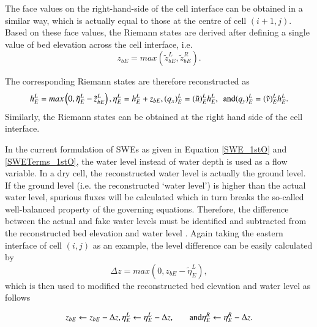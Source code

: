 The face values on the right-hand-side of the cell interface can be obtained in a similar way, which is actually equal to those at the centre of cell $(i + 1, j)$. Based on these face values, the Riemann states are derived after defining a single value of bed elevation across the cell interface, i.e.
\begin{equation}
	\label{SWE_1stO_BedElev}
	z_{bE} = max \left ( \tilde{z}_{bE}^{L}, \tilde{z}_{bE}^{R} \right )
	.
\end{equation}

The corresponding Riemann states are therefore reconstructed as
\begin{equation}
	\label{SWE_1stO_Reconstruction}
	h_{E}^{L} = max \left ( 0, \tilde{\eta}_{E}^{L} - \tilde{z}_{bE}^{L} \right ), \\
	\eta_{E}^{L} = h_{E}^{L} + z_{bE}, \\
	(q_{x})_{E}^{L} = (\tilde{u})_{E}^{L} h_{E}^{L},
	\hspace{1ex} \textrm{and} \hspace{1ex}	\\
	(q_{y})_{E}^{L} = (\tilde{v})_{E}^{L} h_{E}^{L}
	.
\end{equation}
Similarly, the Riemann states can be obtained at the right hand side of the cell interface.

In the current formulation of SWEs as given in Equation \ref{SWE_1stO} and \ref{SWETerms_1stO}, the water level instead of water depth is used as a flow variable. In a dry cell, the reconstructed water level is actually the ground level. If the ground level (i.e. the reconstructed `water level') is higher than the actual water level, spurious fluxes will be calculated which in turn breaks the so-called well-balanced property of the governing equations. Therefore, the difference between the actual and fake water levels must be identified and subtracted from the reconstructed bed elevation and water level \citep{Liang2010a}. Again taking the eastern interface of cell $(i, j)$ as an example, the level difference can be easily calculated by
\begin{equation}
	\label{SWE_1stO_BedShift}
	\Delta z = max \left ( 0, z_{bE} - \tilde{\eta}_{E}^{L} \right )
	,
\end{equation}
which is then used to modified the reconstructed bed elevation and water level as follows

\begin{equation}
	\label{SWE_1stO_ShiftedStates}
	z_{bE} \leftarrow z_{bE} - \Delta z, \\
	\eta_{E}^{L} \leftarrow \eta_{E}^{L} - \Delta z,
	\hspace{4ex} \textrm{and} \hspace{4ex}	\\
	\eta_{E}^{R} \leftarrow \eta_{E}^{R} - \Delta z
	.
\end{equation}

